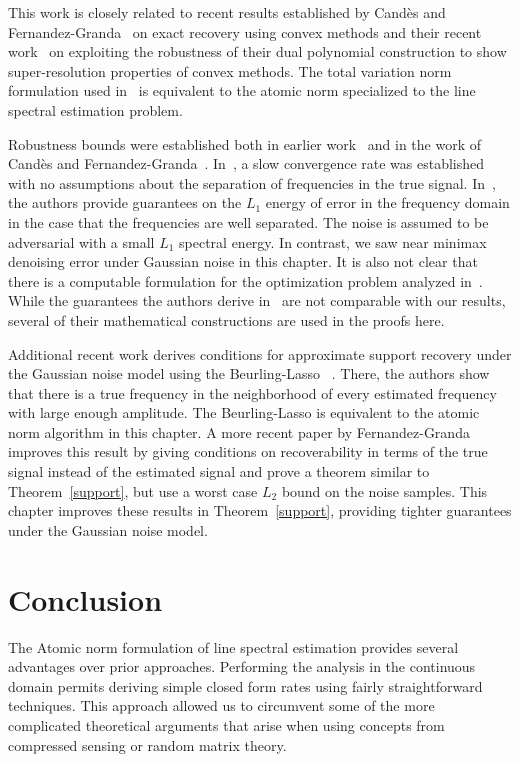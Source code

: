 This work is closely related to recent results established by Cand\`es and
Fernandez-Granda~\cite{cg_exact12} on exact recovery using convex methods and
their recent work~\cite{cg_noisy} on exploiting the robustness of their dual
polynomial construction to show super-resolution properties of convex methods.
The total variation norm formulation used in~\cite{cg_noisy} is equivalent to
the atomic norm specialized to the line spectral estimation problem.

Robustness bounds were established both in earlier work~\cite{btr12} and in the
work of Cand\`es and Fernandez-Granda~\cite{cg_noisy}. In~\cite{btr12}, a slow
convergence rate was established with no assumptions about the separation of
frequencies in the true signal. In~\cite{cg_noisy}, the authors provide
guarantees on the $L_1$ energy of error in the frequency domain in the case that
the frequencies are well separated. The noise is assumed to be adversarial with
a small $L_1$ spectral energy. In contrast, we saw near minimax denoising error
under Gaussian noise in this chapter. It is also not clear that there is a
computable formulation for the optimization problem analyzed in~\cite{cg_noisy}.
While the guarantees the authors derive in~\cite{cg_noisy} are not comparable
with our results, several of their mathematical constructions are used in the
proofs here.

Additional recent work derives conditions for approximate support recovery under
the Gaussian noise model using the Beurling-Lasso ~\cite{azais}. There, the
authors show that there is a true frequency in the neighborhood of every
estimated frequency with large enough amplitude. The Beurling-Lasso is
equivalent to the atomic norm algorithm in this chapter. A more recent paper by
Fernandez-Granda{\cite{granda2}} improves this result by giving conditions on
recoverability in terms of the true signal instead of the estimated signal and
prove a theorem similar to Theorem~\ref{support}, but use a worst case $L_2$
bound on the noise samples. This chapter improves these results in
Theorem~\ref{support}, providing tighter guarantees under the Gaussian noise
model.

\section{Conclusion}\label{sec:conclusions}

The Atomic norm formulation of line spectral estimation provides several
advantages over prior approaches. Performing the analysis in the continuous
domain permits deriving simple closed form rates using fairly straightforward
techniques. This approach allowed us to circumvent some of the more complicated
theoretical arguments that arise when using concepts from compressed sensing or
random matrix theory.

